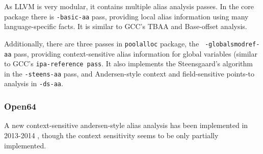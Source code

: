 As LLVM is very modular, it contains multiple alias analysis passes. In the core
package there is {\tt -basic-aa} pass, providing local alias information using
many language-specific facts. It is similar to GCC's TBAA and Base-offset
analysis.

Additionally, there are three passes in {\tt poolalloc} package, the {\tt
-globalsmodref-aa} pass, providing context-sensitive alias information for
global variables (similar to GCC's {\tt ipa-reference pass}. It also implements
the Steensgaard's algorithm in the {\tt -steens-aa} pass, and Andersen-style
context and field-sensitive points-to analysis in {\tt -ds-aa}.

\subsubsection{Open64}

A new context-sensitive andersen-style alias analysis has been implemented in
2013-2014 \cite{sui2014}, though the context sensitivity seems to be only
partially implemented.


